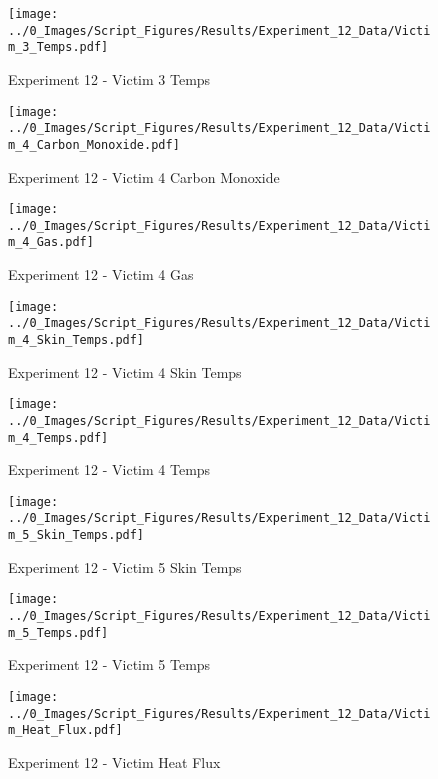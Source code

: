	\begin{figure}[H]
		\centering
		\texttt{[image: ../0\_Images/Script\_Figures/Results/Experiment\_12\_Data/Victim\_3\_Temps.pdf]}
		\caption[]{Experiment 12 - Victim 3 Temps}
	\end{figure}
 
	\clearpage

	\begin{figure}[H]
		\centering
		\texttt{[image: ../0\_Images/Script\_Figures/Results/Experiment\_12\_Data/Victim\_4\_Carbon\_Monoxide.pdf]}
		\caption[]{Experiment 12 - Victim 4 Carbon Monoxide}
	\end{figure}
 

	\begin{figure}[H]
		\centering
		\texttt{[image: ../0\_Images/Script\_Figures/Results/Experiment\_12\_Data/Victim\_4\_Gas.pdf]}
		\caption[]{Experiment 12 - Victim 4 Gas}
	\end{figure}
 
	\clearpage

	\begin{figure}[H]
		\centering
		\texttt{[image: ../0\_Images/Script\_Figures/Results/Experiment\_12\_Data/Victim\_4\_Skin\_Temps.pdf]}
		\caption[]{Experiment 12 - Victim 4 Skin Temps}
	\end{figure}
 

	\begin{figure}[H]
		\centering
		\texttt{[image: ../0\_Images/Script\_Figures/Results/Experiment\_12\_Data/Victim\_4\_Temps.pdf]}
		\caption[]{Experiment 12 - Victim 4 Temps}
	\end{figure}
 
	\clearpage

	\begin{figure}[H]
		\centering
		\texttt{[image: ../0\_Images/Script\_Figures/Results/Experiment\_12\_Data/Victim\_5\_Skin\_Temps.pdf]}
		\caption[]{Experiment 12 - Victim 5 Skin Temps}
	\end{figure}
 

	\begin{figure}[H]
		\centering
		\texttt{[image: ../0\_Images/Script\_Figures/Results/Experiment\_12\_Data/Victim\_5\_Temps.pdf]}
		\caption[]{Experiment 12 - Victim 5 Temps}
	\end{figure}
 
	\clearpage

	\begin{figure}[H]
		\centering
		\texttt{[image: ../0\_Images/Script\_Figures/Results/Experiment\_12\_Data/Victim\_Heat\_Flux.pdf]}
		\caption[]{Experiment 12 - Victim Heat Flux}
	\end{figure}
 

